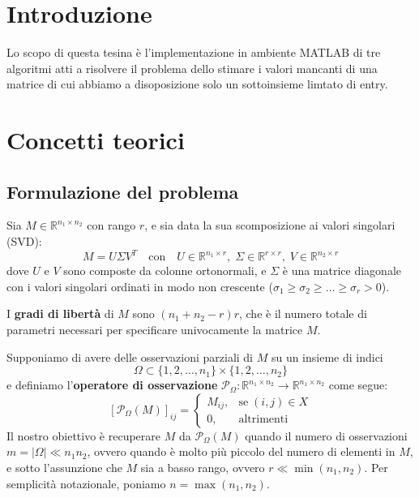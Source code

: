 \documentclass[12pt,a4paper]{report}
\begin{document}


\chapter{Introduzione}

Lo scopo di questa tesina è l'implementazione in ambiente MATLAB di tre algoritmi
atti a risolvere il problema dello stimare i valori mancanti di una matrice di cui
abbiamo a disoposizione solo un sottoinsieme limtato di entry.

{\let\clearpage\relax\chapter{Concetti teorici}}

\section{Formulazione del problema}

Sia $M\in\mathbb{R}^{n_1\times n_2}$ con rango $r$, e sia data la sua scomposizione ai valori
singolari (SVD):
$$M=U\Sigma V^T \quad\text{con}\quad U\in\mathbb{R}^{n_1\times r},
\;\Sigma\in\mathbb{R}^{r\times r},\;V\in\mathbb{R}^{n_2\times r}$$
dove $U$ e $V$ sono composte da colonne ortonormali, e $\Sigma$ è una matrice
diagonale con i valori singolari ordinati in modo non crescente
($\sigma_1\geq\sigma_2\geq\ldots\geq\sigma_r>0$).

I \textbf{gradi di libertà} di $M$ sono $(n_1 + n_2 - r)r$, che è il numero totale di parametri
necessari per specificare univocamente la matrice $M$.

\newpage

Supponiamo di avere delle osservazioni parziali di $M$ su un insieme di indici
$$\Omega \subset \{1,2,\ldots,n_1\}\times\{1,2,\ldots,n_2\}$$
e definiamo l'\textbf{operatore di osservazione}
$\mathcal{P}_{\Omega}:\mathbb{R}^{n_1\times n_2}\to\mathbb{R}^{n_1\times n_2}$ come segue:
$$\left[\mathcal{P}_{\Omega}(M)\right] _{ij}=\left\{\begin{matrix}M_{ij}, & \text{se}\; (i,j)\in X \\ 0, & \text{altrimenti}\end{matrix}\right.$$
Il nostro obiettivo è recuperare $M$ da $\mathcal{P}_{\Omega}(M)$
quando il numero di osservazioni\\ $m = |\Omega| \ll n_1 n_2$, ovvero quando
è molto più piccolo del numero di elementi in $M$, e sotto l'assunzione che $M$
sia a basso rango, ovvero $r\ll\min(n_1,n_2)$.
Per semplicità notazionale, poniamo $n=\max(n_1,n_2)$.
\end{document}
